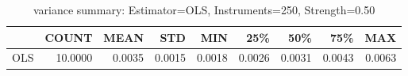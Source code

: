 \begin{table}[ht]
\centering
\caption{variance summary: Estimator=OLS, Instruments=250, Strength=0.50}
\begin{tabular}{lrrrrrrrr}
\toprule
 & COUNT & MEAN & STD & MIN & 25\% & 50\% & 75\% & MAX \\
\midrule
OLS & 10.0000 & 0.0035 & 0.0015 & 0.0018 & 0.0026 & 0.0031 & 0.0043 & 0.0063 \\
\bottomrule
\end{tabular}
\end{table}
